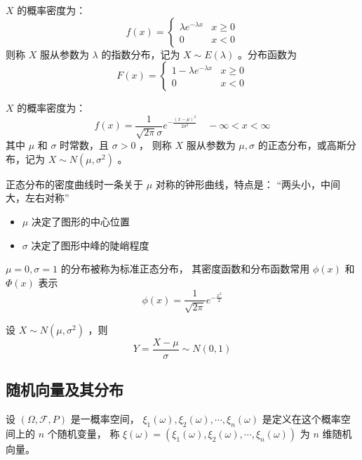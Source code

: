  $ X $ 的概率密度为：
\begin{equation}
    f(x) = \left\{ \begin{array}{ll}
        \lambda e^{-\lambda x} & x \geqslant 0 \\
        0 & x < 0
    \end{array} \right.
\end{equation}
则称 $ X $ 服从参数为 $ \lambda $ 的指数分布，记为 $ X \sim E(\lambda) $ 。分布函数为
\begin{equation}
    F(x) = \left\{ \begin{array}{ll}
        1 - \lambda e^{-\lambda x} & x \geqslant 0 \\
        0 & x < 0
    \end{array} \right.
\end{equation}

 $ X $ 的概率密度为：
\begin{equation}
    f(x) = \frac{1}{\sqrt{2\pi} \sigma} e ^{- \frac{(x-\mu)^2}{2 \sigma^2}} \quad -\infty < x < \infty
\end{equation}
其中 $ \mu $ 和 $ \sigma $ 时常数，且 $ \sigma > 0 $ ，
则称 $ X $ 服从参数为 $ \mu, \sigma $ 的正态分布，或高斯分布，记为 $ X \sim N(\mu, \sigma^2) $ 。

 正态分布的密度曲线时一条关于 $ \mu $ 对称的钟形曲线，特点是：
“两头小，中间大，左右对称”
\begin{itemize}[leftmargin=\subparitemindent]
    \item $ \mu $ 决定了图形的中心位置
    \item $ \sigma $ 决定了图形中峰的陡峭程度
\end{itemize}

 $ \mu = 0, \sigma = 1 $ 的分布被称为标准正态分布，
其密度函数和分布函数常用 $ \phi(x) $ 和 $ \Phi(x) $ 表示
$$ \phi(x) = \frac{1}{\sqrt{2\pi}} e^{-\frac{x^2}{2}} $$

 设 $ X \sim N(\mu, \sigma^2) $ ，则 $$ Y = \frac{X-\mu}{\sigma} \sim N(0,1) $$


\subsection{随机向量及其分布}

 设 $ (\Omega, \mathcal{F}, P) $ 是一概率空间，
$ \xi_{1}{(\omega)} , \xi_{2}{(\omega)} , \cdots , \xi_{n}{(\omega)}  $ 是定义在这个概率空间上的 $ n $ 个随机变量，
称 $ \xi(\omega) = (\xi_{1}{(\omega)} , \xi_{2}{(\omega)} , \cdots , \xi_{n}{(\omega)}) $ 为 $ n $ 维随机向量。

